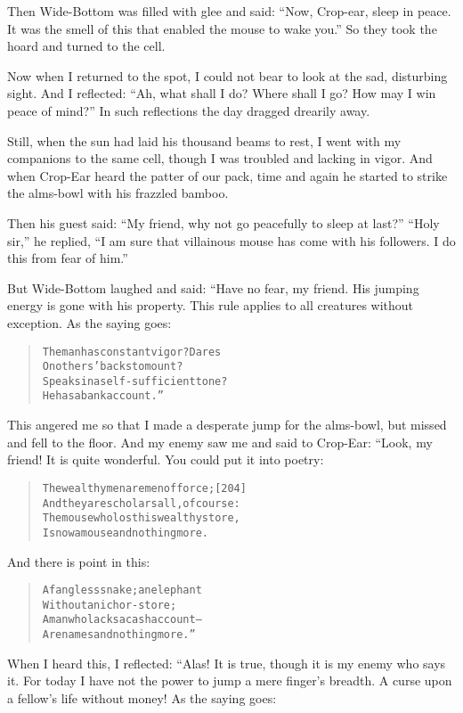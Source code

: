 \documentclass[article, twoside, 14pt]{memoir}
\renewenvironment{verbatim}{%
\begin{quote}%
\vskip -10pt%
\begin{alltt}\normalfont\large}{\end{alltt}%
\end{quote}%
\vskip -10pt
} %
\begin{document}
Then Wide-Bottom was filled with glee and said:
``Now, Crop-ear, sleep in peace. It was the smell of this that enabled the mouse to wake you.''
So they took the hoard and turned to the cell.

Now when I returned to the spot, I could not bear to look at the
sad, disturbing sight. And I reflected:
``Ah, what shall I do? Where shall I go? How may I win peace of mind?''
In such reflections the day dragged drearily away.

Still, when the sun had laid his thousand beams to rest, I went
with my companions to the same cell, though I was troubled and
lacking in vigor. And when Crop-Ear heard the patter of our pack,
time and again he started to strike the alms-bowl with his frazzled
bamboo.

Then his guest said:
``My friend, why not go peacefully to sleep at last?''
``Holy sir,'' he replied,
``I am sure that villainous mouse has come with his followers. I do this from fear of him.''

But Wide-Bottom laughed and said: “Have no fear, my friend. His
jumping energy is gone with his property. This rule applies to all
creatures without exception. As the saying goes:

\begin{verbatim}
The man has constant vigor? Dares
    On others' backs to mount?
Speaks in a self-sufficient tone?
    He has a bank account.”
\end{verbatim}
This angered me so that I made a desperate jump for the alms-bowl,
but missed and fell to the floor. And my enemy saw me and said to
Crop-Ear: “Look, my friend! It is quite wonderful. You could put it
into poetry:

\begin{verbatim}
The wealthy men are men of force;                       [204]
And they are scholars all, of course:
The mouse who lost his wealthy store,
Is now a mouse and nothing more.
\end{verbatim}
And there is point in this:

\begin{verbatim}
A fangless snake; an elephant
Without an ichor-store;
A man who lacks a cash account--
Are names and nothing more.”
\end{verbatim}
When I heard this, I reflected: “Alas! It is true, though it is my
enemy who says it. For today I have not the power to jump a mere
finger's breadth. A curse upon a fellow's life without money! As
the saying goes:
\end{document}
